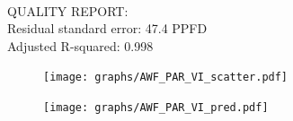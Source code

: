 \documentclass[oneside]{report}
\begin{document}
\hrulefill\\
QUALITY REPORT:\\
Residual standard error: 47.4 PPFD\\
Adjusted R-squared: 0.998



\begin{figure}[H]
  \centering
  \texttt{[image: graphs/AWF\_PAR\_VI\_scatter.pdf]}
\end{figure}




\begin{figure}[H]
  \centering
  \texttt{[image: graphs/AWF\_PAR\_VI\_pred.pdf]}
\end{figure}
\end{document}
